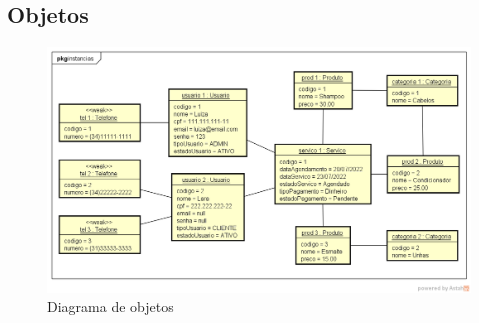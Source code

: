 \subsection{Objetos}
\begin{figure}[H]
	\centering
	\includegraphics[width=1\linewidth]{imagens/objetos}
	\caption[Diagrama de objetos]{Diagrama de objetos}
	\label{fig:fig4}
\end{figure}